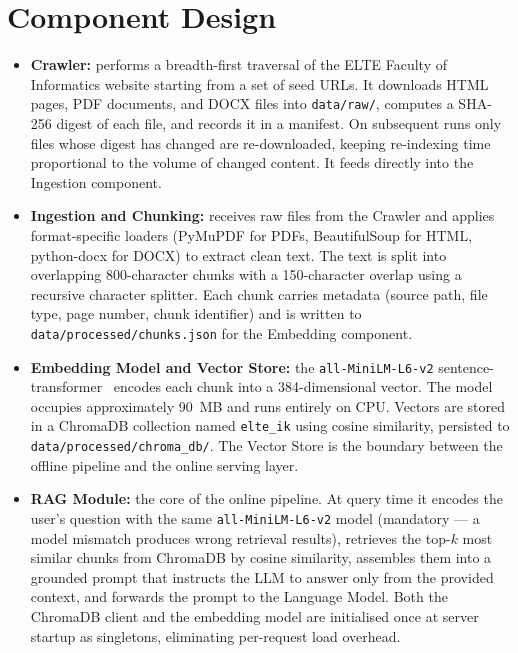 \section{Component Design}
\label{sec:design-components}

\begin{itemize}
    \item \textbf{Crawler:} performs a breadth-first traversal of the ELTE Faculty of Informatics website starting from a set of seed URLs. It downloads HTML pages, PDF documents, and DOCX files into \texttt{data/raw/}, computes a SHA-256 digest of each file, and records it in a manifest. On subsequent runs only files whose digest has changed are re-downloaded, keeping re-indexing time proportional to the volume of changed content. It feeds directly into the Ingestion component.

    \item \textbf{Ingestion and Chunking:} receives raw files from the Crawler and applies format-specific loaders (PyMuPDF for PDFs, BeautifulSoup for HTML, python-docx for DOCX) to extract clean text. The text is split into overlapping 800-character chunks with a 150-character overlap using a recursive character splitter. Each chunk carries metadata (source path, file type, page number, chunk identifier) and is written to \texttt{data/processed/chunks.json} for the Embedding component.

    \item \textbf{Embedding Model and Vector Store:} the \texttt{all-MiniLM-L6-v2} sentence-transformer~\cite{reimers2019sbert} encodes each chunk into a 384-dimensional vector. The model occupies approximately 90~MB and runs entirely on CPU. Vectors are stored in a ChromaDB collection named \texttt{elte\_ik} using cosine similarity, persisted to \texttt{data/processed/chroma\_db/}. The Vector Store is the boundary between the offline pipeline and the online serving layer.

    \item \textbf{RAG Module:} the core of the online pipeline. At query time it encodes the user's question with the same \texttt{all-MiniLM-L6-v2} model (mandatory — a model mismatch produces wrong retrieval results), retrieves the top-$k$ most similar chunks from ChromaDB by cosine similarity, assembles them into a grounded prompt that instructs the LLM to answer only from the provided context, and forwards the prompt to the Language Model. Both the ChromaDB client and the embedding model are initialised once at server startup as singletons, eliminating per-request load overhead.


\end{itemize}
